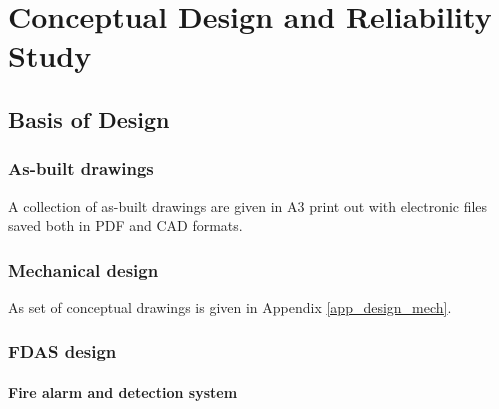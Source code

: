 \chapter{Conceptual Design and Reliability Study} %
\label{Chapter6}
%
\section{Basis of Design}
\subsection{As-built drawings}
A collection of as-built drawings are given in A3 print out with electronic files saved both in PDF and CAD formats.
\subsection{Mechanical design}
As set of conceptual drawings is given in Appendix \ref{app_design_mech}.
\subsection{FDAS design}
\subsubsection{Fire alarm and detection system}
